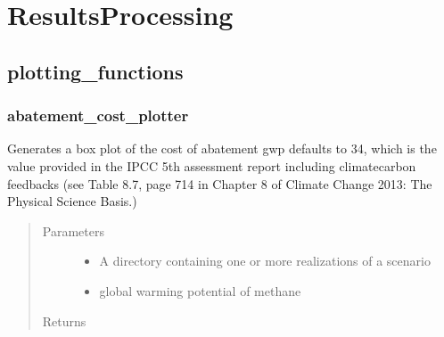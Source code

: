 \documentclass[letterpaper,10pt,english]{sphinxmanual}
\begin{document}
\section{ResultsProcessing}
\label{\detokenize{index:resultsprocessing}}

\subsection{plotting\_functions}
\label{\detokenize{index:module-feast.ResultsProcessing.plotting_functions}}\label{\detokenize{index:plotting-functions}}

\subsubsection{abatement\_cost\_plotter}
\label{\detokenize{index:abatement-cost-plotter}}

\begin{fulllineitems}
\label{\detokenize{index:feast.ResultsProcessing.plotting_functions.abatement_cost_plotter}}
Generates a box plot of the cost of abatement
gwp defaults to 34, which is the value provided in the IPCC 5th assessment report including climate\sphinxhyphen{}carbon feedbacks
(see Table 8.7, page 714 in Chapter 8 of Climate Change 2013: The Physical Science Basis.)
\begin{quote}\begin{description}
\item[{Parameters}] \leavevmode\begin{itemize}
\item {} 
 \textendash{} A directory containing one or more realizations of a scenario

\item {} 
 \textendash{} global warming potential of methane

\end{itemize}

\item[{Returns}] \leavevmode


\end{description}\end{quote}

\end{fulllineitems}
\end{document}
